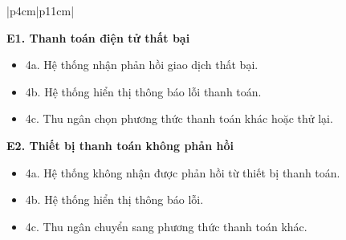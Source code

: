 \begin{longtable}{|p{4cm}|p{11cm}|}
\begin{minipage}[t]{\linewidth}
\textbf{E1. Thanh toán điện tử thất bại}

\begin{itemize}
\item 4a. Hệ thống nhận phản hồi giao dịch thất bại.
\item 4b. Hệ thống hiển thị thông báo lỗi thanh toán.
\item 4c. Thu ngân chọn phương thức thanh toán khác hoặc thử lại.
\end{itemize}

\textbf{E2. Thiết bị thanh toán không phản hồi}

\begin{itemize}
\item 4a. Hệ thống không nhận được phản hồi từ thiết bị thanh toán.
\item 4b. Hệ thống hiển thị thông báo lỗi.
\item 4c. Thu ngân chuyển sang phương thức thanh toán khác.
\end{itemize}

\vspace{0.3mm}
\end{minipage}
\\ \hline

\end{longtable}

\renewcommand{\arraystretch}{1.2}

